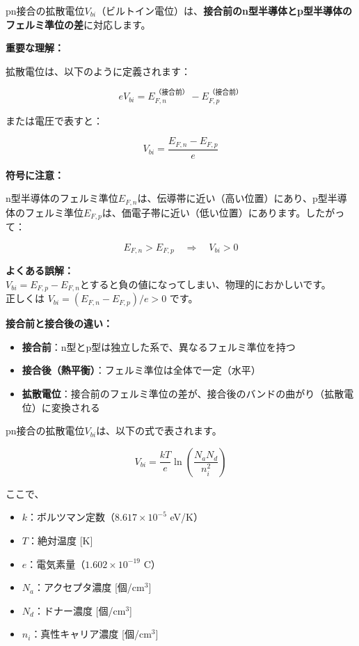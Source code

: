 pn接合の拡散電位$V_{bi}$（ビルトイン電位）は、\textbf{接合前のn型半導体とp型半導体のフェルミ準位の差}に対応します。

\textbf{重要な理解：}

拡散電位は、以下のように定義されます：

\begin{equation}
eV_{bi} = E_{F,n}^{\text{（接合前）}} - E_{F,p}^{\text{（接合前）}}
\end{equation}

または電圧で表すと：

\begin{equation}
V_{bi} = \frac{E_{F,n} - E_{F,p}}{e}
\end{equation}

\textbf{符号に注意：}

n型半導体のフェルミ準位$E_{F,n}$は、伝導帯に近い（高い位置）にあり、p型半導体のフェルミ準位$E_{F,p}$は、価電子帯に近い（低い位置）にあります。したがって：

\begin{equation}
E_{F,n} > E_{F,p} \quad \Rightarrow \quad V_{bi} > 0
\end{equation}

\begin{screen}
\textbf{よくある誤解：}\\
$V_{bi} = E_{F,p} - E_{F,n}$とすると負の値になってしまい、物理的におかしいです。\\
正しくは $V_{bi} = (E_{F,n} - E_{F,p})/e > 0$ です。
\end{screen}

\textbf{接合前と接合後の違い：}

\begin{itemize}
\item \textbf{接合前}：n型とp型は独立した系で、異なるフェルミ準位を持つ
\item \textbf{接合後（熱平衡）}：フェルミ準位は全体で一定（水平）
\item \textbf{拡散電位}：接合前のフェルミ準位の差が、接合後のバンドの曲がり（拡散電位）に変換される
\end{itemize}

pn接合の拡散電位$V_{bi}$は、以下の式で表されます。

\begin{equation}
V_{bi} = \frac{kT}{e} \ln\left(\frac{N_a N_d}{n_i^2}\right)
\end{equation}

ここで、
\begin{itemize}
\item $k$：ボルツマン定数（$8.617 \times 10^{-5}$ eV/K）
\item $T$：絶対温度 [K]
\item $e$：電気素量（$1.602 \times 10^{-19}$ C）
\item $N_a$：アクセプタ濃度 [個/cm$^3$]
\item $N_d$：ドナー濃度 [個/cm$^3$]
\item $n_i$：真性キャリア濃度 [個/cm$^3$]
\end{itemize}

